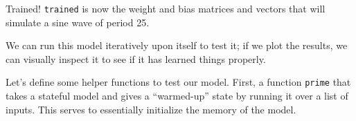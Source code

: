 \documentclass[]{article}
\newenvironment{Shaded}{}{}
\newcommand{\CommentTok}[1]{\textcolor[rgb]{0.38,0.63,0.69}{\textit{#1}}}
\newcommand{\DataTypeTok}[1]{\textcolor[rgb]{0.56,0.13,0.00}{#1}}
\newcommand{\DecValTok}[1]{\textcolor[rgb]{0.25,0.63,0.44}{#1}}
\newcommand{\FunctionTok}[1]{\textcolor[rgb]{0.02,0.16,0.49}{#1}}
\newcommand{\KeywordTok}[1]{\textcolor[rgb]{0.00,0.44,0.13}{\textbf{#1}}}
\newcommand{\NormalTok}[1]{#1}
\newcommand{\OperatorTok}[1]{\textcolor[rgb]{0.40,0.40,0.40}{#1}}
\newcommand{\OtherTok}[1]{\textcolor[rgb]{0.00,0.44,0.13}{#1}}
\begin{document}
\begin{Shaded}
\end{Shaded}

Trained! \texttt{trained} is now the weight and bias matrices and vectors that
will simulate a sine wave of period 25.

We can run this model iteratively upon itself to test it; if we plot the
results, we can visually inspect it to see if it has learned things properly.

Let's define some helper functions to test our model. First, a function
\texttt{prime} that takes a stateful model and gives a ``warmed-up'' state by
running it over a list of inputs. This serves to essentially initialize the
memory of the model.
\end{document}
